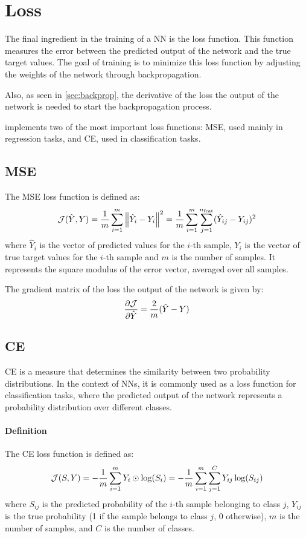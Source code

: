 \section{Loss}
The final ingredient in the training of a \acl{NN} is the loss function. This function measures the error between the predicted output of the network and the true target values. The goal of training is to minimize this loss function by adjusting the weights of the network through backpropagation.

Also, as seen in \cref{sec:backprop}, the derivative of the loss \wrt the output of the network is needed to start the backpropagation process.

\mfnet implements two of the most important loss functions: \ac{MSE}, used mainly in regression tasks, and \ac{CE}, used in classification tasks.

\subsection{\acl{MSE}}
The \ac{MSE} loss function is defined as:
\begin{equation}
    \mathcal{J}(\hat{Y}, Y) = \frac{1}{m} \sum_{i=1}^{m} \norm{\hat{Y}_i - Y_i}^2 = \frac{1}{m} \sum_{i=1}^{m} \sum_{j=1}^{n_\text{feat}} (\hat{Y}_{ij} - Y_{ij})^2
\end{equation}
where $\hat{Y}_i$ is the vector of predicted values for the $i$-th sample, $Y_i$ is the vector of true target values for the $i$-th sample and $m$ is the number of samples. It represents the square modulus of the error vector, averaged over all samples.

The gradient matrix of the loss \wrt the output of the network is given by:
\begin{equation}
    \pdv{\mathcal{J}}{\hat{Y}} = \frac{2}{m} (\hat{Y} - Y)
\end{equation}

\subsection{\acl{CE}}
\acl{CE} is a measure that determines the similarity between two probability distributions. In the context of \aclp{NN}, it is commonly used as a loss function for classification tasks, where the predicted output of the network represents a probability distribution over different classes.

\paragraph{Definition}
The \ac{CE} loss function is defined as:
\begin{equation}
    \mathcal{J}(S, Y) = -\frac{1}{m} \sum_{i=1}^{m} Y_i \odot \log(S_i) = -\frac{1}{m} \sum_{i=1}^{m} \sum_{j=1}^{C} Y_{ij} \log(S_{ij})
\end{equation}
where $S_{ij}$ is the predicted probability of the $i$-th sample belonging to class $j$, $Y_{ij}$ is the true probability (1 if the sample belongs to class $j$, 0 otherwise), $m$ is the number of samples, and $C$ is the number of classes.

